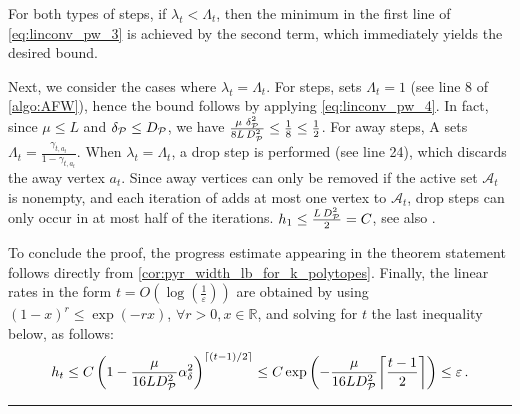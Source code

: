 \documentclass[twoside]{article}
\newcommand{\jmlrBlackBox}{\rule{1.5ex}{1.5ex}}
\newcommand{\jmlrQED}{\hfill\jmlrBlackBox\par\bigskip}
\providecommand{\proofname}{Proof}
\renewenvironment{proof}{\par\noindent{\bfseries\upshape \proofname\ }}{\jmlrQED}
\newcommand{\mP}{\mathcal{P}}
\newcommand{\mA}{\mathcal{A}}
\let\epsilon\varepsilon
\begin{document}
\begin{proof}
For both types of steps, if $\lambda_t < \Lambda_t$, then the minimum in the first line of \cref{eq:linconv_pw_3} is achieved by the second term, which immediately yields the desired bound.

Next, we consider the cases where $\lambda_t = \Lambda_t$.
For \FW{} steps, \AFW{} sets $\Lambda_t = 1$ (see line 8 of \cref{algo:AFW}), hence the bound follows by applying \cref{eq:linconv_pw_4}. In fact, since $\mu \le L$ and $\pw{\mP} \le \diam{\mP}$, we have $\frac{\mu\,\pw[2]{\mP}}{8L\,\diam[2]{\mP}} \le \frac{1}{8} \le \frac{1}{2}$.
For away steps, A\FW{} sets $\Lambda_t = \frac{\gamma_{t,a_t}}{1-\gamma_{t,a_t}}$.
When $\lambda_t = \Lambda_t$, a drop step is performed (see line 24), which discards the away vertex $a_t$. 
Since away vertices can only be removed if the active set $\mA_t$ is nonempty, and each iteration of \AFW{} adds at most one vertex to $\mA_t$, drop steps can only occur in at most half of the iterations.
%
$h_1 \le \frac{L\,\diam{\mP}^2}{2} = C$, see also {\citep[Theorem 2.2]{BCC+23}}.

To conclude the proof, the progress estimate appearing in the theorem statement follows directly from \cref{cor:pyr_width_lb_for_k_polytopes}.
Finally, the linear rates in the form $t = O(\log\left(\frac{1}{\epsilon}\right))$ are obtained by using  $(1-x)^r \le \exp(-rx)$, $\forall r > 0, x \in \mathbb{R}$, and solving for $t$ the last inequality below, as follows:
\[
h_t
\leq C \left(1 - \frac{\mu}{16L\diam[2]{\mP}}\alpha_{\pw{}}^2\right)^{\lceil (t-1)/2 \rceil}
\le
C \exp\left(- \frac{\mu}{16L\diam[2]{\mP}} {\left\lceil \frac{t-1}{2} \right\rceil}\right)
\le \epsilon\,.
\]
\end{proof}
\end{document}
